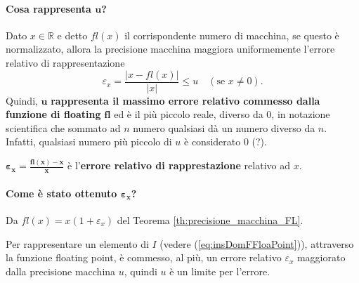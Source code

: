 \paragraph{Cosa rappresenta $\boldsymbol{u}$?}
Dato $x\in\mathbb R$ e detto $fl(x)$ il corrispondente numero di macchina, se questo è normalizzato, allora la precisione macchina \gls{maggiora uniformemente} l'errore relativo di rappresentazione
\begin{equation*}
	\varepsilon_x = \frac{|x-fl(x)|}{|x|}\leq u\quad (\text{se } x\neq 0).
\end{equation*}
Quindi, $\boldsymbol u$ \textbf{rappresenta il massimo errore relativo commesso dalla funzione di floating} $\boldsymbol{fl}$ ed è il più piccolo reale, diverso da 0, in notazione scientifica che sommato ad $n$ numero qualsiasi dà un numero diverso da $n$. Infatti, qualsiasi numero più piccolo di $u$ è considerato 0 (?).

\addtocounter{footnote}{-2}



\begin{definition}
	$\boldsymbol{\varepsilon_x}=\boldsymbol{\frac{fl(x)-x}{x}}$ è l'\textbf{errore relativo di rapprestazione} relativo ad $x$.
\end{definition}
\paragraph{Come è stato ottenuto $\boldsymbol{\varepsilon_x}$?}{Da $fl(x)=x(1+\varepsilon_x)$ del Teorema \ref{th:precisione_macchina_FL}.}

Per rappresentare un elemento di $I$ (vedere (\ref{eq:insDomFFloaPoint})), attraverso la funzione floating point, è commesso, al più, un errore relativo $\varepsilon_x$ maggiorato dalla precisione macchina $u$, quindi $u$ è un limite per l'errore.

